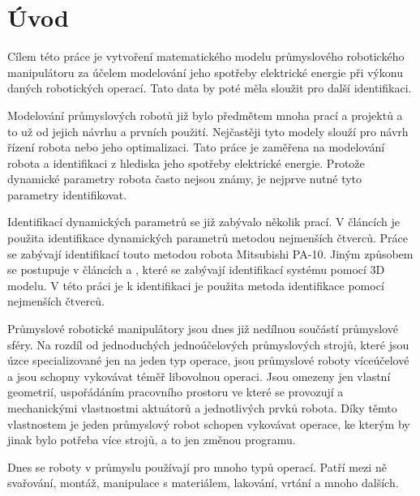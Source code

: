 

\chapter{Úvod}


Cílem této práce je vytvoření matematického modelu průmyslového robotického manipulátoru za účelem modelování jeho spotřeby elektrické energie při výkonu daných robotických operací. Tato data by poté měla sloužit pro další identifikaci.

Modelování průmyslových robotů již bylo předmětem mnoha prací a projektů a to už od jejich návrhu a prvních použití. Nejčastěji tyto modely slouží pro návrh řízení robota nebo jeho optimalizaci. Tato práce je zaměřena na modelování robota a identifikaci z hlediska jeho spotřeby elektrické energie. Protože dynamické parametry robota často nejsou známy, je nejprve nutné tyto parametry identifikovat.

Identifikací dynamických parametrů se již zabývalo několik prací. V článcích \cite{par_iden_rob}\cite{clos_dyn_par} je použita identifikace dynamických parametrů metodou nejmenších čtverců. Práce \cite{dyn_mod_ind}\cite{dyn_ind_mits} se zabývají identifikací touto metodou robota Mitsubishi PA-10. Jiným způsobem se postupuje v článcích \cite{dyn_ind_man} a \cite{akeel}, které se zabývají identifikací systému pomocí 3D modelu. V této práci je k identifikaci je použita metoda identifikace pomocí nejmenších čtverců.

Průmyslové robotické manipulátory jsou dnes již nedílnou součástí průmyslové sféry. Na rozdíl od jednoduchých jednoúčelových průmyslových strojů, které jsou úzce specializované jen na jeden typ operace, jsou průmyslové roboty víceúčelové a jsou schopny vykovávat téměř libovolnou operaci. Jsou omezeny jen vlastní geometrií, uspořádáním pracovního prostoru ve které se provozují a mechanickými vlastnostmi aktuátorů a jednotlivých prvků robota. Díky těmto vlastnostem je jeden průmyslový robot schopen vykovávat operace, ke kterým by jinak bylo potřeba více strojů, a to jen změnou programu.

Dnes se roboty v průmyslu používají pro mnoho typů operací. Patří mezi ně svařování, montáž, manipulace s materiálem, lakování, vrtání a mnoho dalších.








